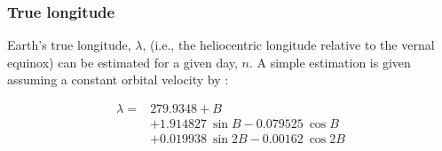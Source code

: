 \subsubsection{True longitude}
\label{sec:lambda}
Earth's true longitude, $\lambda$, (i.e., the heliocentric longitude relative to the vernal equinox) can be estimated for a given day, $n$. 
A simple estimation is given assuming a constant orbital velocity by \parencite{woolf68}:

\begin{equation}
\label{eq:woolf}
	\begin{split}
    	\lambda = & 279.9348 + B \\
    	          & + 1.914827 \: \sin B - 0.079525 \: \cos B \\
    	          & + 0.019938 \: \sin 2B - 0.00162 \: \cos 2B
    \end{split}
\end{equation} 

